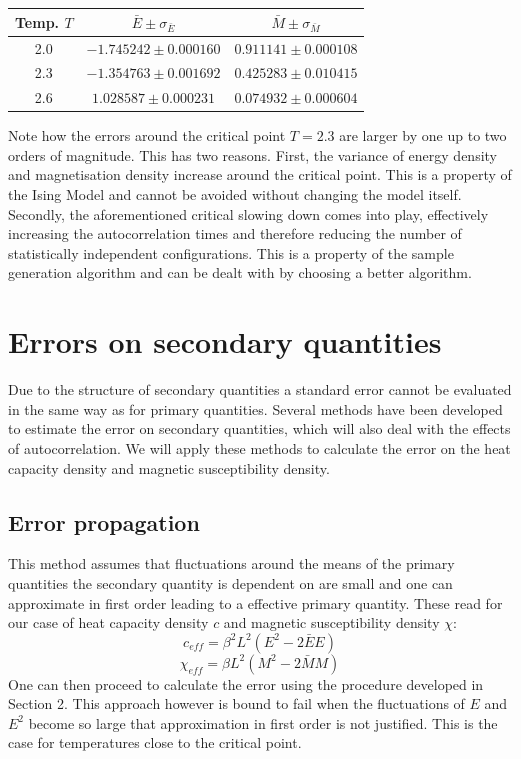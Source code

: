 \documentclass[11pt, a4paper]{scrartcl}
\begin{document}
    \begin{center}
    \begin{tabular}{|c||c|c|}
        \hline
        Temp. $T$ & $\bar{E} \pm \sigma_{\bar{E}}$ & $\bar{M} \pm \sigma_{\bar{M}}$ \\
        \hline
        \hline
        2.0 & $-1.745242 \pm 0.000160$ & $0.911141 \pm 0.000108$ \\
        \hline
        2.3 & $-1.354763 \pm 0.001692$ & $0.425283 \pm 0.010415$ \\
        \hline
        2.6 & $1.028587 \pm 0.000231$ & $0.074932 \pm 0.000604$ \\
        \hline
    \end{tabular}
    \end{center}
    Note how the errors around the critical point $T = 2.3$ are larger by one up to two orders of magnitude. This has two reasons. First, the variance of energy density and magnetisation density increase around the critical point. This is a property of the Ising Model and cannot be avoided without changing the model itself. Secondly, the aforementioned critical slowing down comes into play, effectively increasing the autocorrelation times and therefore reducing the number of statistically independent configurations. This is a property of the sample generation algorithm and can be dealt with by choosing a better algorithm.


\section{Errors on secondary quantities}
    Due to the structure of secondary quantities a standard error cannot be evaluated in the same way as for primary quantities. Several methods have been developed to estimate the error on secondary quantities, which will also deal with the effects of autocorrelation. We will apply these methods to calculate the error on the heat capacity density and magnetic susceptibility density.
\subsection{Error propagation}
    This method assumes that fluctuations around the means of the primary quantities the secondary quantity is dependent on are small and one can approximate in first order leading to a effective primary quantity. These read for our case of heat capacity density $c$ and magnetic susceptibility density $\chi$:
    $$
    c_{eff} = \beta ^ 2 L ^ 2 (E^2 - 2 \bar{E} E)
    $$
    $$
    \chi_{eff} = \beta L ^ 2 (M^2 - 2 \bar{M} M)
    $$
    One can then proceed to calculate the error using the procedure developed in Section 2. This approach however is bound to fail when the fluctuations of $E$ and $E^2$ become so large that approximation in first order is not justified. This is the case for temperatures close to the critical point.
\end{document}

